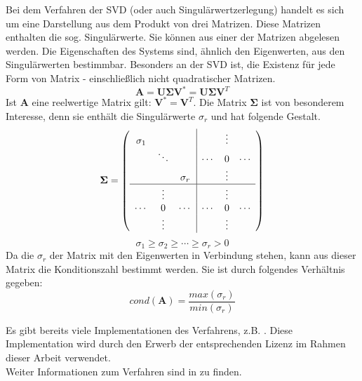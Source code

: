 Bei dem Verfahren der SVD (oder auch Singulärwertzerlegung) handelt es sich um eine Darstellung aus dem Produkt von drei Matrizen. Diese Matrizen enthalten die sog. Singulärwerte. Sie können aus einer der Matrizen abgelesen werden. Die Eigenschaften des Systems sind, ähnlich den Eigenwerten, aus den Singulärwerten bestimmbar. Besonders an der SVD ist, die Existenz für jede Form von Matrix - einschließlich nicht quadratischer Matrizen.
%
\begin{equation}
\mathbf{A}= \mathbf{U \Sigma V^*} = \mathbf{U \Sigma V}^T
\end{equation}
Ist $\mathbf{A}$ eine reelwertige Matrix gilt: $ \mathbf{V^*} = \mathbf{V}^T $. Die Matrix $\mathbf{ \Sigma }$ ist von besonderem Interesse, denn sie enthält die Singulärwerte $\sigma_r$ und hat folgende Gestalt.
%
\begin{equation}
	\mathbf{\Sigma} = \left(\begin{array}{ccc|ccc}
	\sigma_1 &          &          &        & \vdots &        \\
	         & \ddots   &          & \cdots & 0      & \cdots \\
	         &          & \sigma_r &        & \vdots &        \\
	\hline
	         &  \vdots  &          &        & \vdots &        \\
	\cdots   &  0       & \cdots   & \cdots & 0      & \cdots \\
	         &  \vdots  &          &        & \vdots &        \\
	
	\end{array}\right)\nonumber
\end{equation}
\begin{equation}
\sigma_1\geq\sigma_2\geq\cdots\geq\sigma_r> 0 \nonumber
\end{equation}
%
Da die $\sigma_r$ der Matrix mit den Eigenwerten in Verbindung stehen, kann aus dieser Matrix die Konditionszahl bestimmt werden. Sie ist durch folgendes Verhältnis gegeben: 
\begin{equation}
	\label{eq:cond_from_svd}
	cond(\mathbf{A})=\frac{max(\sigma_r)}{min(\sigma_r)} 
\end{equation} 

Es gibt bereits viele Implementationen des Verfahrens, z.B. \cite{press2007numerical}. Diese Implementation wird durch den Erwerb der entsprechenden Lizenz im Rahmen dieser Arbeit verwendet.\\
Weiter Informationen zum Verfahren sind in \cite[Kaptiel 4.6.3]{bronstejn2012taschenbuch} zu finden.